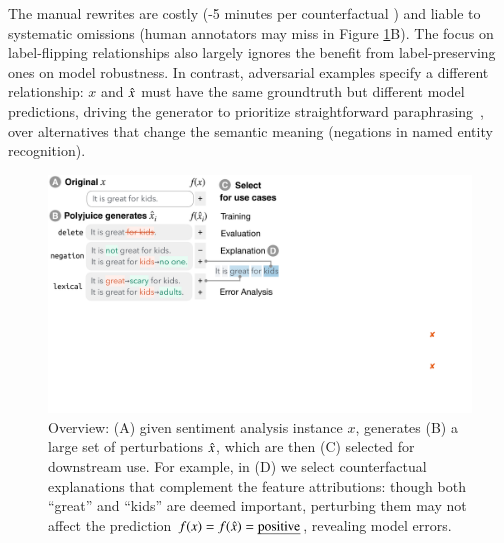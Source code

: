 The manual rewrites are costly (-5 minutes per counterfactual \cite{kaushik2019learning}) and liable to systematic omissions (\eg human annotators may miss  in Figure \ref{fig:teaser}B).
The focus on label-flipping relationships also largely ignores the benefit from label-preserving ones on model robustness.
In contrast, adversarial examples specify a different relationship: $x$ and $\hat{x}$ must have the same groundtruth but different model predictions, driving the generator to prioritize straightforward paraphrasing~\cite{iyyer2018adversarial, ribeiro2018semantically}, over alternatives that change the semantic meaning (\eg negations in named entity recognition).

\begin{figure}[t]
\centering
\includegraphics[trim={0 18cm 30.5cm 0cm},clip, width=1\columnwidth]{figures/teaser.pdf}
\vspace{-15pt}
\caption{
Overview: (A) given sentiment analysis instance $x$, \sysname generates (B) a large set of perturbations $\hat{x}$, which are then (C) selected for downstream use.
For example, in (D) we select counterfactual explanations that complement the feature attributions: though both ``great'' and ``kids'' are deemed important, perturbing them may not affect the prediction $f(x)=f(\hat{x})=\text{\emph{positive}}$, revealing model errors.\footnotemark
}
\vspace{-15pt}
\label{fig:teaser}
\end{figure} 


